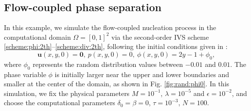 \subsection{Flow-coupled phase separation}\label{subsec:e3}
In this example, we simulate the flow-coupled nucleation process in the computational domain $\Omega=[0,1]^2$ via the second-order IVS scheme \eqref{scheme:phi:2th}--\eqref{scheme:div:2th}, following the initial conditions given in \cite{li2023global}:
\[
\bm u(x, y,0)=\mathbf{0}, ~ p(x, y, 0)={0}, ~ \phi(x, y,0)=2y-1+ \phi_0,
\]
where $\phi_0$ represents the random distribution values between $-0.01$ and $0.01$.
The phase variable $\phi$ is initially larger near the upper and lower boundaries and smaller at the center of the domain, as shown in Fig. \ref{fig:rand:phi0}. In this simulation, we fix the physical parameters $M=10^{-1}$, $\lambda=10^{-5}$ and $\epsilon=10^{-2}$, and choose the computational parameters $\delta_0 = \beta=0$, $\tau=10^{-3}$, $N=100$.

